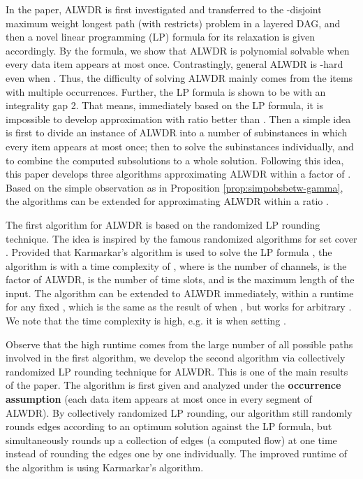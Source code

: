 \documentclass[11pt,english,onecolumn,draftcls]{IEEEtran}
\theoremstyle{plain}
\theoremstyle{plain}
\theoremstyle{plain}
\theoremstyle{plain}
\begin{document}
In the paper, ALWDR is first investigated and transferred
to the -disjoint maximum weight longest path (with restricts)
problem in a layered DAG, and then a novel linear programming (LP)
formula for its relaxation is given accordingly. By the formula, we
show that ALWDR is polynomial solvable when every data item
appears at most once. Contrastingly, general ALWDR is -hard
even when . Thus, the difficulty of solving ALWDR
mainly comes from the items with multiple occurrences. Further, the
LP formula is shown to be with an integrality gap 2. That means, immediately
based on the LP formula, it is impossible to develop approximation
with ratio better than . Then a simple idea is first
to divide an instance of ALWDR into a number of subinstances
in which every item appears at most once; then to solve the subinstances
individually, and to combine the computed subsolutions to a whole
solution. Following this idea, this paper develops three algorithms
approximating ALWDR within a factor of .
Based on the simple observation as in Proposition \ref{prop:simpobsbetw-gamma},
the algorithms can be extended for approximating ALWDR within
a ratio .

The first algorithm for ALWDR is based on the randomized
LP rounding technique. The idea is inspired by the famous randomized
algorithms for set cover \cite{korte2002combinatorial}. Provided
that Karmarkar's algorithm is used to solve the LP formula \cite{korte2002combinatorial},
the algorithm is with a time complexity of ,
where  is the number of channels,  is the factor of ALWDR,
 is the number of time slots, and  is the maximum length of
the input. The algorithm can be extended to ALWDR immediately,
within a runtime \textbf{}
for any fixed , which is the same as the result of \cite{lu2014data}
when , but works for arbitrary . We note that
the time complexity is high, e.g. it is  when
setting .

Observe that the high runtime comes from the large number of all possible
paths involved in the first algorithm, we develop the second algorithm
via collectively randomized LP rounding technique for ALWDR.
This is one of the main results of the paper. The algorithm is first
given and analyzed under the \textbf{occurrence assumption} (each
data item appears at most once in every segment of ALWDR).
By collectively randomized LP rounding, our algorithm still randomly
rounds edges according to an optimum solution against the LP formula,
but simultaneously rounds up a collection of edges (a computed flow)
at one time instead of rounding the edges one by one individually.
The improved runtime of the algorithm is  using
Karmarkar's algorithm.\textbf{ }
\end{document}
